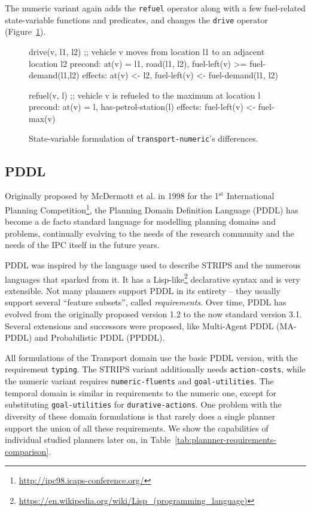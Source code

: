 The numeric variant again adds the \verb+refuel+ operator along with
a few fuel-related state-variable functions and predicates, and changes 
the \verb+drive+ operator (Figure~\ref{code:statevar-numeric}).

\begin{figure}[htb]
\begin{code}
drive(v, l1, l2)
  ;; vehicle v moves from location l1 to an adjacent location l2
  precond: at(v) = l1, road(l1, l2), fuel-left(v) >= fuel-demand(l1,l2)
  effects: at(v) <- l2, fuel-left(v) <-  fuel-demand(l1, l2)
  
refuel(v, l)
  ;; vehicle v is refueled to the maximum at location l
  precond: at(v) = l, has-petrol-station(l)
  effects: fuel-left(v) <- fuel-max(v)
\end{code}
\caption{State-variable formulation of \texttt{transport-numeric}'s differences.}
\label{code:statevar-numeric}
\end{figure}

\subsection{PDDL}\label{pddl}

Originally proposed by McDermott et al. in 1998 for the 1$^{\mathrm{st}}$ International Planning
Competition\footnote{\url{http://ipc98.icaps-conference.org/}},
the Planning Domain Definition Language\citep{McDermott1998} (PDDL) has become
a de facto standard language for modelling planning domains and problems,
continually evolving to the needs of the
research community and the needs of the IPC itself in the future years.

PDDL was inspired by the language used to describe STRIPS\citep{Fikes1971}
and the numerous languages that sparked from it.
It has a Lisp-like\footnote{\url{https://en.wikipedia.org/wiki/Lisp_(programming_language)}}
declarative syntax and is very extensible.
Not many planners support PDDL in its entirety -- they usually support 
several ``feature subsets'', called \textit{requirements}.
Over time, PDDL has evolved from the originally proposed version 1.2
to the now standard version 3.1. Several extensions and successors were proposed,
like Multi-Agent PDDL
(MA-PDDL) and
Probabilistic PDDL
(PPDDL).

All formulations of the Transport domain use the basic PDDL version, with the requirement \verb+typing+.
The STRIPS variant additionally needs \verb+action-costs+, while the numeric variant
requires \verb+numeric-fluents+ and \verb+goal-utilities+.
The temporal domain is similar in requirements to the numeric one, except for
substituting \verb+goal-utilities+ for \verb+durative-actions+.
One problem with the diversity of these domain formulations is that rarely does
a single planner support the union of all these requirements.
We show the capabilities of individual studied planners
later on, in Table~\ref{tab:plannner-requirements-comparison}.

